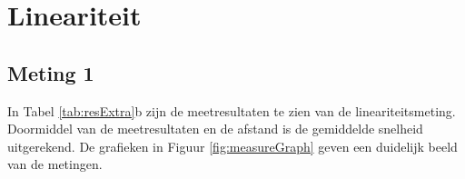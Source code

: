 \documentclass{report}
\begin{document}
\begin{table}
\centering
\caption{De resultaten van de onbekende afstandsmetingen en de lineairiteitsmetingen.}
\label{tab:resExtra}
\quad
{}
\end{table}

\section{Lineariteit}
\subsection*{Meting 1}
In Tabel \ref{tab:resExtra}b zijn de meetresultaten te zien van de lineariteitsmeting. Doormiddel van de meetresultaten en de afstand is de gemiddelde snelheid uitgerekend. De grafieken in Figuur \ref{fig:measureGraph} geven een duidelijk beeld van de metingen.
\end{document}
